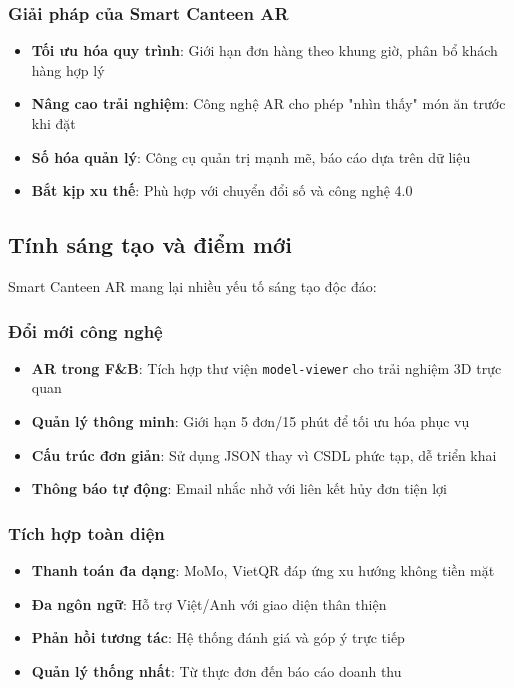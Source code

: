 \documentclass[12pt,a4paper]{article}
\begin{document}
\subsubsection{Giải pháp của Smart Canteen AR}
\begin{itemize}[leftmargin=1cm]
    \item \textbf{Tối ưu hóa quy trình}: Giới hạn đơn hàng theo khung giờ, phân bổ khách hàng hợp lý
    \item \textbf{Nâng cao trải nghiệm}: Công nghệ AR cho phép "nhìn thấy" món ăn trước khi đặt
    \item \textbf{Số hóa quản lý}: Công cụ quản trị mạnh mẽ, báo cáo dựa trên dữ liệu
    \item \textbf{Bắt kịp xu thế}: Phù hợp với chuyển đổi số và công nghệ 4.0
\end{itemize}

\subsection{Tính sáng tạo và điểm mới}
Smart Canteen AR mang lại nhiều yếu tố sáng tạo độc đáo:

\subsubsection{Đổi mới công nghệ}
\begin{itemize}[leftmargin=1cm]
    \item \textbf{AR trong F\&B}: Tích hợp thư viện \texttt{model-viewer} cho trải nghiệm 3D trực quan
    \item \textbf{Quản lý thông minh}: Giới hạn 5 đơn/15 phút để tối ưu hóa phục vụ
    \item \textbf{Cấu trúc đơn giản}: Sử dụng JSON thay vì CSDL phức tạp, dễ triển khai
    \item \textbf{Thông báo tự động}: Email nhắc nhở với liên kết hủy đơn tiện lợi
\end{itemize}

\subsubsection{Tích hợp toàn diện}
\begin{itemize}[leftmargin=1cm]
    \item \textbf{Thanh toán đa dạng}: MoMo, VietQR đáp ứng xu hướng không tiền mặt
    \item \textbf{Đa ngôn ngữ}: Hỗ trợ Việt/Anh với giao diện thân thiện
    \item \textbf{Phản hồi tương tác}: Hệ thống đánh giá và góp ý trực tiếp
    \item \textbf{Quản lý thống nhất}: Từ thực đơn đến báo cáo doanh thu
\end{itemize}
\end{document}
